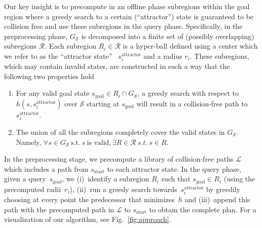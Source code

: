 \documentclass[letterpaper]{article} %
\newcommand{\calL}{\ensuremath{\mathcal{L}}\xspace}
\newcommand{\calS}{\ensuremath{\mathcal{S}}\xspace}
\newcommand{\calR}{\ensuremath{\mathcal{R}}\xspace}
\newcommand{\sAttract}{\ensuremath{s^{\text{attractor}}_i}\xspace}
\newcommand{\sStart}{\ensuremath{s_{\text{start}}\xspace}}
\newcommand{\sGoal}{\ensuremath{s_{\text{goal}}\xspace}}
\begin{document}
Our key insight is to precompute in an offline phase subregions within the goal region where a greedy search to a certain (``attractor'') state is guaranteed to be collision free and use these subregions in the query phase.
Specifically, in the preprocessing phase, $G_\calS$ is decomposed into a finite  set of (possibly overlapping) subregions $\calR$.
Each subregion $R_i \in \calR$ is a hyper-ball defined using a center which we refer to as the ``attractor state''~
\sAttract and a radius $r_i$.
These subregions, which may contain invalid states, are constructed in such a way that the following two properties hold
\begin{enumerate}[label={\textbf{P\arabic*}}]
  \item \label{property:1} For any valid goal state $s_{\text{goal}} \in R_i \cap G_\calS$, a greedy search with respect to $h(s, \sAttract)$ over $\calS$ starting at $\sGoal$ will result in a collision-free path to \sAttract.
  \item \label{property:2} The union of all the subregions completely cover the valid states in $G_\calS$. 
		  Namely, $\forall s \in G_\calS~\text{s.t.}~s~\text{is valid}, \exists R \in \calR \ s.t. \ s \in R$.
\end{enumerate}

In the preprocessing stage, we precompute a library of collision-free paths $\calL$ which includes a path from $\sStart$ to each attractor state. 
In the query phase, given a query~\sGoal, we 
(i)~identify a subregion $R_i$ such that $\sGoal \in R_i$ (using the precomputed radii~$r_i$),
(ii)~run a greedy search towards~\sAttract by greedily choosing at every point the predecessor that minimizes~$h$ and
(iii)~append this path with the precomputed path in $\calL$ to $\sStart$ to obtain the complete plan.
For a visualization of our algorithm, see Fig.~\ref{fig:approach}.
\end{document}
